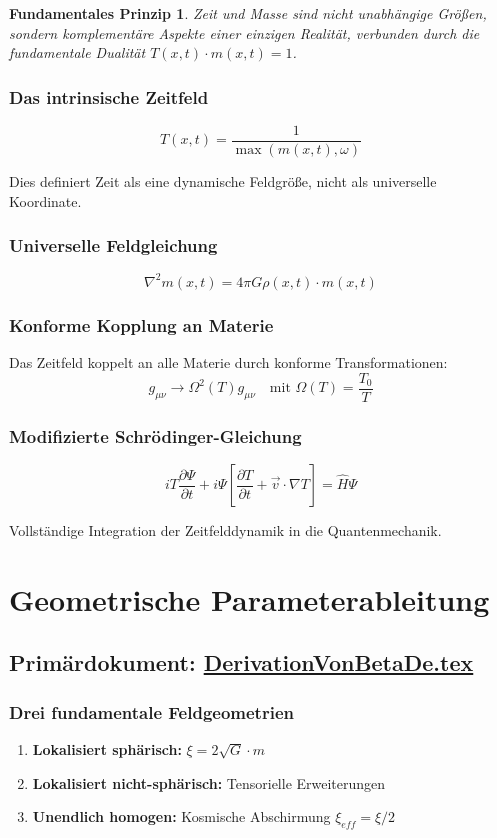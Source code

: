 \documentclass[12pt,a4paper]{report}
\newtheorem{principle}{Fundamentales Prinzip}[chapter]
\begin{document}
	\begin{principle}
		Zeit und Masse sind nicht unabhängige Größen, sondern komplementäre Aspekte einer einzigen Realität, verbunden durch die fundamentale Dualität $T(x,t) \cdot m(x,t) = 1$.
	\end{principle}
	
	\subsubsection{Das intrinsische Zeitfeld}
	$$T(x,t) = \frac{1}{\max(m(x,t), \omega)}$$
	
	Dies definiert Zeit als eine dynamische Feldgröße, nicht als universelle Koordinate.
	
	\subsubsection{Universelle Feldgleichung}
	$$\nabla^2 m(x,t) = 4\pi G \rho(x,t) \cdot m(x,t)$$
	
	\subsubsection{Konforme Kopplung an Materie}
	Das Zeitfeld koppelt an alle Materie durch konforme Transformationen:
	$$g_{\mu\nu} \rightarrow \Omega^2(T) g_{\mu\nu} \quad \text{mit } \Omega(T) = \frac{T_0}{T}$$
	
	\subsubsection{Modifizierte Schrödinger-Gleichung}
	$$iT\frac{\partial \Psi}{\partial t} + i\Psi\left[\frac{\partial T}{\partial t} + \vec{v} \cdot \nabla T\right] = \hat{H}\Psi$$
	
	Vollständige Integration der Zeitfelddynamik in die Quantenmechanik.
	
	\section{Geometrische Parameterableitung}
	\subsection{Primärdokument: \href{https://github.com/jpascher/T0-Time-Mass-Duality/tree/main/2/pdf/DerivationVonBetaDe.pdf}{DerivationVonBetaDe.tex}}
	
	\subsubsection{Drei fundamentale Feldgeometrien}
	\begin{enumerate}
		\item \textbf{Lokalisiert sphärisch:} $\xi = 2\sqrt{G} \cdot m$
		\item \textbf{Lokalisiert nicht-sphärisch:} Tensorielle Erweiterungen
		\item \textbf{Unendlich homogen:} Kosmische Abschirmung $\xi_{eff} = \xi/2$
	\end{enumerate}
	
\end{document}
